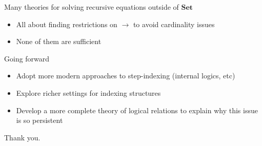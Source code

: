 \documentclass{beamer}
\newcommand{\SET}{\ensuremath{\mathbf{Set}}}
\begin{document}
\begin{frame}
  Many theories for solving recursive equations outside of $\SET$
  \begin{itemize}
  \item All about finding restrictions on $\to$ to avoid cardinality
    issues
  \item None of them are sufficient
  \end{itemize}
\end{frame}

\begin{frame}
  \centering
  Going forward
  \begin{itemize}
  \item Adopt more modern approaches to step-indexing (internal
    logics, etc)
  \item Explore richer settings for indexing structures
  \item Develop a more complete theory of logical relations to explain
    why this issue is so persistent
  \end{itemize}
  \pause
  \bigskip
  Thank you.
\end{frame}
\end{document}
